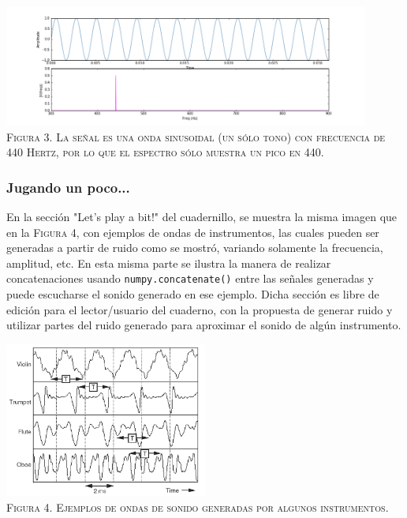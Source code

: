 \documentclass[a4paper]{article}
\begin{document}
\begin{center}
\includegraphics[width=0.9\textwidth]{spec}\\
\textsc{Figura 3. La señal es una onda sinusoidal (un sólo tono) con frecuencia de 440 Hertz, por lo que el espectro sólo muestra un pico en 440.}\\
\end{center}

\subsubsection{\sffamily Jugando un poco...}

\noindent En la sección "Let's play a bit!" del cuadernillo, se muestra la misma imagen que en la \textsc{Figura 4}, con ejemplos de ondas de instrumentos, las cuales pueden ser generadas a partir de ruido como se mostró, variando solamente la frecuencia, amplitud, etc. En esta misma parte se ilustra la manera de realizar concatenaciones usando \texttt{numpy.concatenate()} entre las señales generadas y puede escucharse el sonido generado en ese ejemplo. Dicha sección es libre de edición para el lector/usuario del cuaderno, con la propuesta de generar ruido y utilizar partes del ruido generado para aproximar el sonido de algún instrumento.\\

\begin{center}
\includegraphics[width=0.5\textwidth]{examples}\\
\textsc{Figura 4. Ejemplos de ondas de sonido generadas por algunos instrumentos.}
\end{center}
\end{document}
